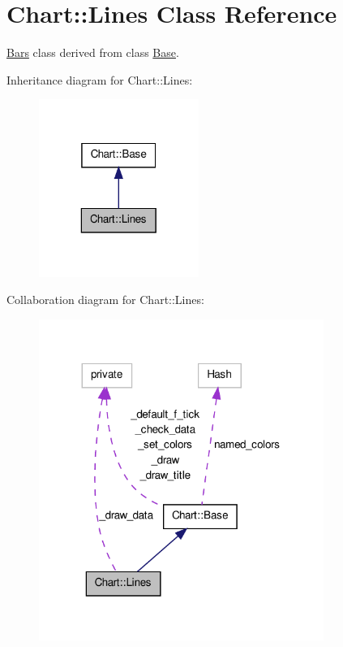\hypertarget{classChart_1_1Lines}{
\section{Chart::Lines Class Reference}
\label{classChart_1_1Lines}
}


\hyperlink{classChart_1_1Bars}{Bars} class derived from class \hyperlink{classChart_1_1Base}{Base}.  




Inheritance diagram for Chart::Lines:\nopagebreak
\begin{figure}[H]
\begin{center}
\leavevmode
\includegraphics[width=148pt]{classChart_1_1Lines__inherit__graph}
\end{center}
\end{figure}


Collaboration diagram for Chart::Lines:\nopagebreak
\begin{figure}[H]
\begin{center}
\leavevmode
\includegraphics[width=263pt]{classChart_1_1Lines__coll__graph}
\end{center}
\end{figure}
